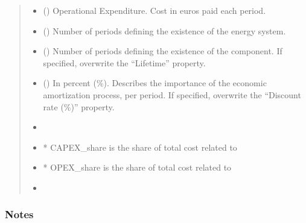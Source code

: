 \documentclass[letterpaper,10pt,english]{sphinxmanual}
\begin{document}
\begin{fulllineitems}
\begin{fulllineitems}
\begin{quote}
\begin{description}
\begin{itemize}
\item {} 
\sphinxAtStartPar
{} () \textendash{} Operational Expenditure. Cost in euros paid each period.

\item {} 
\sphinxAtStartPar
{} () \textendash{} Number of periods defining the existence of the energy system.

\item {} 
\sphinxAtStartPar
{} (\sphinxstyleliteralemphasis{\sphinxupquote{, }}) \textendash{} Number of periods defining the existence of the component.
If specified, overwrite the “Lifetime” property.

\item {} 
\sphinxAtStartPar
{} () \textendash{} In percent (\%). Describes the importance of the economic amortization process, per period.
If specified, overwrite the “Discount rate (\%)” property.

\end{itemize}

\sphinxAtStartPar
\begin{itemize}
\item {} 
\sphinxAtStartPar
{}

\item {} 
\sphinxAtStartPar
* CAPEX\_share is the share of total cost related to 

\item {} 
\sphinxAtStartPar
* OPEX\_share is the share of total cost related to 

\item {} 
\sphinxAtStartPar
{}

\end{itemize}


\end{description}\end{quote}
\subsubsection*{Notes}


\end{fulllineitems}
\end{fulllineitems}
\end{document}
